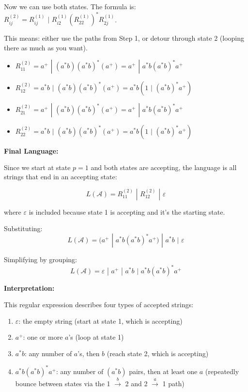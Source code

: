 \documentclass{article}
\theoremstyle{theorem}
\theoremstyle{definition}
\theoremstyle{remark}
\begin{document}
Now we can use both states. The formula is: $R_{ij}^{(2)} = R_{ij}^{(1)} \,\, | \,\, R_{i2}^{(1)} (R_{22}^{(1)})^* R_{2j}^{(1)}$.

This means: either use the paths from Step 1, or detour through state 2 (looping there as much as you want).

\begin{itemize}
  \item $R_{11}^{(2)} = a^+ \,\, | \,\, (a^*b)(a^*b)^*(a^+) = a^+ \,\, | \,\, a^*b(a^*b)^*a^+$
  \item $R_{12}^{(2)} = a^*b \,\, | \,\, (a^*b)(a^*b)^*(a^+) = a^*b(1 \,\, | \,\, (a^*b)^*a^+)$
  \item $R_{21}^{(2)} = a^+ \,\, | \,\, (a^*b)(a^*b)^*(a^+) = a^+ \,\, | \,\, a^*b(a^*b)^*a^+$
  \item $R_{22}^{(2)} = a^*b \,\, | \,\, (a^*b)(a^*b)^*(a^+) = a^*b(1 \,\, | \,\, (a^*b)^*a^+)$
\end{itemize}

\textbf{Final Language:}

Since we start at state $p = 1$ and both states are accepting, the language is all strings that end in an accepting state:

\[
L(\mathcal{A}) = R_{11}^{(2)} \,\, | \,\, R_{12}^{(2)} \,\, | \,\, \varepsilon
\]

where $\varepsilon$ is included because state 1 is accepting and it's the starting state.

Substituting:
\[
L(\mathcal{A}) = (a^+ \,\, | \,\, a^*b(a^*b)^*a^+) \,\, | \,\, a^*b \,\, | \,\, \varepsilon
\]

Simplifying by grouping:
\[
L(\mathcal{A}) = \varepsilon \,\, | \,\, a^+ \,\, | \,\, a^*b \,\, | \,\, a^*b(a^*b)^*a^+
\]

\textbf{Interpretation:}

This regular expression describes four types of accepted strings:
\begin{enumerate}
  \item $\varepsilon$: the empty string (start at state 1, which is accepting)
  \item $a^+$: one or more $a$'s (loop at state 1)
  \item $a^*b$: any number of $a$'s, then $b$ (reach state 2, which is accepting)
  \item $a^*b(a^*b)^*a^+$: any number of $(a^*b)$ pairs, then at least one $a$ (repeatedly bounce between states via the 1 $\xrightarrow{b}$ 2 and 2 $\xrightarrow{a}$ 1 path)
\end{enumerate}
\end{document}
